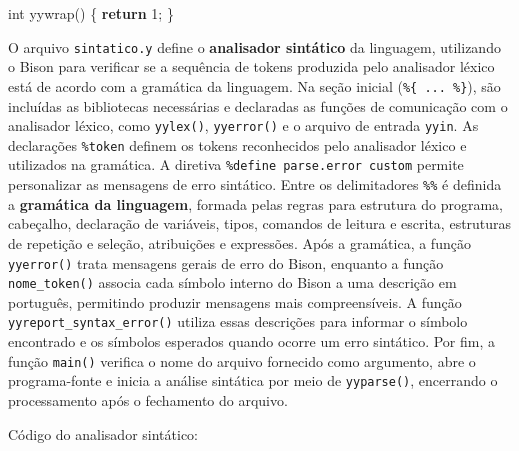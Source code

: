 \documentclass[
  brazilian,
  letterpaper,
]{book}
\newenvironment{Shaded}{\begin{snugshade}}{\end{snugshade}}
\newcommand{\ControlFlowTok}[1]{\textcolor[rgb]{0.00,0.23,0.31}{\textbf{#1}}}
\newcommand{\DataTypeTok}[1]{\textcolor[rgb]{0.68,0.00,0.00}{#1}}
\newcommand{\DecValTok}[1]{\textcolor[rgb]{0.68,0.00,0.00}{#1}}
\newcommand{\NormalTok}[1]{\textcolor[rgb]{0.00,0.23,0.31}{#1}}
\newcommand{\OperatorTok}[1]{\textcolor[rgb]{0.37,0.37,0.37}{#1}}
\theoremstyle{plain}
\theoremstyle{definition}
\theoremstyle{remark}
\begin{document}
\begin{Shaded}
\begin{Highlighting}[]
\DataTypeTok{int}\NormalTok{ yywrap}\OperatorTok{()} \OperatorTok{\{}
  \ControlFlowTok{return} \DecValTok{1}\OperatorTok{;}
\OperatorTok{\}}
\end{Highlighting}
\end{Shaded}

O arquivo \texttt{sintatico.y} define o \textbf{analisador sintático} da
linguagem, utilizando o Bison para verificar se a sequência de tokens
produzida pelo analisador léxico está de acordo com a gramática da
linguagem. Na seção inicial (\texttt{\%\{\ ...\ \%\}}), são incluídas as
bibliotecas necessárias e declaradas as funções de comunicação com o
analisador léxico, como \texttt{yylex()}, \texttt{yyerror()} e o arquivo
de entrada \texttt{yyin}. As declarações \texttt{\%token} definem os
tokens reconhecidos pelo analisador léxico e utilizados na gramática. A
diretiva \texttt{\%define\ parse.error\ custom} permite personalizar as
mensagens de erro sintático. Entre os delimitadores \texttt{\%\%} é
definida a \textbf{gramática da linguagem}, formada pelas regras para
estrutura do programa, cabeçalho, declaração de variáveis, tipos,
comandos de leitura e escrita, estruturas de repetição e seleção,
atribuições e expressões. Após a gramática, a função \texttt{yyerror()}
trata mensagens gerais de erro do Bison, enquanto a função
\texttt{nome\_token()} associa cada símbolo interno do Bison a uma
descrição em português, permitindo produzir mensagens mais
compreensíveis. A função \texttt{yyreport\_syntax\_error()} utiliza
essas descrições para informar o símbolo encontrado e os símbolos
esperados quando ocorre um erro sintático. Por fim, a função
\texttt{main()} verifica o nome do arquivo fornecido como argumento,
abre o programa-fonte e inicia a análise sintática por meio de
\texttt{yyparse()}, encerrando o processamento após o fechamento do
arquivo.

Código do analisador sintático:
\end{document}

